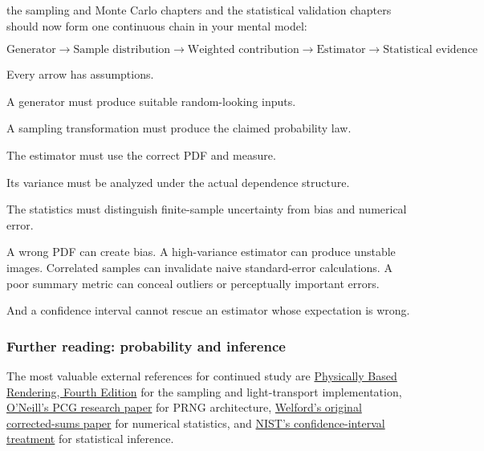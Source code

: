 \hypertarget{02-foundations-ii-ch031-final-synthesis-what-the-35-parts-establish}{}

the sampling and Monte Carlo chapters and the statistical validation chapters should now form one continuous chain in your mental model:

\[
 \boxed{ \text{Generator} \rightarrow \text{Sample distribution} \rightarrow \text{Weighted contribution} \rightarrow \text{Estimator} \rightarrow \text{Statistical evidence} }
\]

Every arrow has assumptions.

A generator must produce suitable random-looking inputs.

A sampling transformation must produce the claimed probability law.

The estimator must use the correct PDF and measure.

Its variance must be analyzed under the actual dependence structure.

The statistics must distinguish finite-sample uncertainty from bias and numerical error.

A wrong PDF can create bias. A high-variance estimator can produce unstable images. Correlated samples can invalidate naive standard-error calculations. A poor summary metric can conceal outliers or perceptually important errors.

And a confidence interval cannot rescue an estimator whose expectation is wrong.

\subsubsection{Further reading: probability and inference}\label{02-foundations-ii-ch031-further-reading-probability-and-inference}

\hypertarget{02-foundations-ii-ch031-further-reading-probability-and-inference}{}

The most valuable external references for continued study are \href{https://pbr-book.org/4ed/?utm_source=chatgpt.com}{Physically Based Rendering, Fourth Edition} for the sampling and light-transport implementation, \href{https://www.pcg-random.org/paper.html?utm_source=chatgpt.com}{O'Neill's PCG research paper} for PRNG architecture, \href{https://doi.org/10.1080/00401706.1962.10490022?utm_source=chatgpt.com}{Welford's original corrected-sums paper} for numerical statistics, and \href{https://www.itl.nist.gov/div898/handbook/eda/section3/eda352.htm?utm_source=chatgpt.com}{NIST's confidence-interval treatment} for statistical inference.

